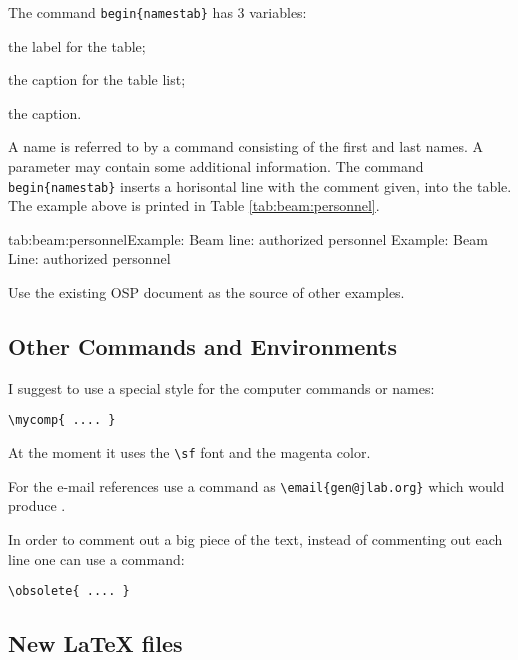 \documentclass[12pt,letterpaper]{article}
\begin{document}
The command {{\color{blue}\verb|begin{namestab}|}} has 3 variables:
\begin{list}{.~}{\setlength{\itemsep}{-0.15cm}}
  \item the label for the table; 
  \item the caption for the table list;
  \item the caption.
\end{list}
A name is referred to by a command consisting of the first and last names.
A parameter may contain some additional information. The command
{{\color{blue}\verb|begin{namestab}|}} inserts a horisontal line 
with the comment given, into the table. The example above
is printed in Table \ref{tab:beam:personnel}.
\begin{namestab}{tab:beam:personnel}{Example: Beam line: authorized personnel}{%
   Example: Beam Line: authorized personnel}
\end{namestab}

Use the existing OSP document as the source of other examples.

\subsection{Other Commands and Environments}
\label{sec:otherenv}

  I suggest to use a special style for the computer
  commands or names:
  {\color{blue}
   \begin{verbatim}
\mycomp{ .... }
  \end{verbatim}%
  }\noindent
  At the moment it uses the {\color{blue}\verb|\sf|} font
  and the magenta color.

  For the e-mail references use a command as {\color{blue}\verb|\email{gen@jlab.org}|}
  which would produce .

  In order to comment out a big piece of the text, instead
  of commenting out each line one can use 
  a command:
  {\color{blue}
   \begin{verbatim}
\obsolete{ .... }
  \end{verbatim}%
  }\noindent

\subsection{New \LaTeX{} files}
\label{sec:newlatex}
\end{document}
